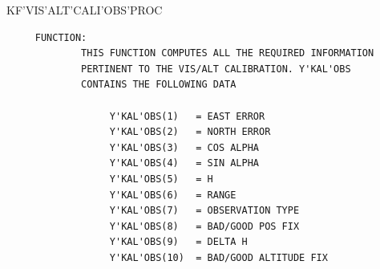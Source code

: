 \begin{frame}
KF'VIS'ALT'CALI'OBS'PROC
\begin{verbatim}
     FUNCTION:
             THIS FUNCTION COMPUTES ALL THE REQUIRED INFORMATION
             PERTINENT TO THE VIS/ALT CALIBRATION. Y'KAL'OBS
             CONTAINS THE FOLLOWING DATA

                  Y'KAL'OBS(1)   = EAST ERROR
                  Y'KAL'OBS(2)   = NORTH ERROR
                  Y'KAL'OBS(3)   = COS ALPHA
                  Y'KAL'OBS(4)   = SIN ALPHA
                  Y'KAL'OBS(5)   = H
                  Y'KAL'OBS(6)   = RANGE
                  Y'KAL'OBS(7)   = OBSERVATION TYPE
                  Y'KAL'OBS(8)   = BAD/GOOD POS FIX
                  Y'KAL'OBS(9)   = DELTA H
                  Y'KAL'OBS(10)  = BAD/GOOD ALTITUDE FIX

\end{verbatim}
\end{frame}
